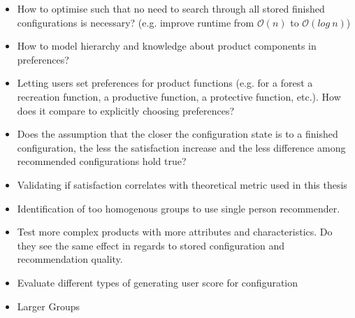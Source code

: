 \begin{itemize}
    \item How to optimise such that no need to search through all stored finished configurations is necessary? (e.g. improve runtime from $\mathcal{O}(n)$ to $\mathcal{O}(log\ n)$)
    \item How to model hierarchy and knowledge about product components in preferences?
    \item Letting users set preferences for product functions (e.g. for a forest a recreation function, a productive function, a protective function, etc.). How does it compare to explicitly choosing preferences?
    \item Does the assumption that the closer the configuration state is to a finished configuration, the less the satisfaction increase and the less difference among recommended configurations hold true?
    \item Validating if satisfaction correlates with theoretical metric used in this thesis
    \item Identification of too homogenous groups to use single person recommender.
    \item Test more complex products with more attributes and characteristics. Do they see the same effect in regards to stored configuration and recommendation quality.
    \item Evaluate different types of generating user score for configuration
    \item Larger Groups
\end{itemize}
